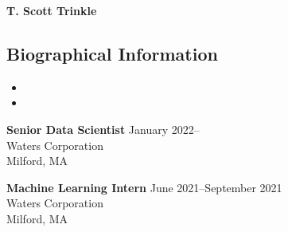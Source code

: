 \documentclass[10pt,letterpaper]{article}
\begin{document}
\begin{center}
{\LARGE \textbf{T. Scott Trinkle}}\\
\end{center}
\vspace{-1em}

\subsection*{Biographical Information}
\begin{itemize}[noitemsep]
\item[]  
\item[]  
\end{itemize}

\begin{benumerate}{1}
\item
  \textbf{Senior Data Scientist} \hfill January 2022--\\
  Waters Corporation\\
  Milford, MA
\end{benumerate}

\begin{benumerate}{1}
\item
  \textbf{Machine Learning Intern} \hfill June 2021--September 2021\\
  Waters Corporation\\
  Milford, MA
\end{benumerate}
\end{document}
